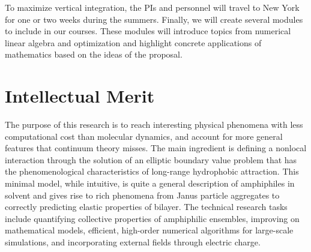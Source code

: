 To maximize vertical integration, the PIs and personnel will travel to
New York for one or two weeks during the summers. Finally, we will
create several modules to include in our courses. These modules will
introduce topics from numerical linear algebra and optimization and
highlight concrete applications of mathematics based on the ideas of the
proposal.

\section{Intellectual Merit}
\label{sec:IntellectualMerit}
The purpose of this research is to reach interesting physical phenomena
with less computational cost than molecular dynamics, and account for
more general features that continuum theory misses. The main ingredient
is defining a nonlocal interaction through the solution of an elliptic
boundary value problem that has the phenomenological characteristics of
long-range hydrophobic attraction. This minimal model, while intuitive,
is quite a general description of amphiphiles in solvent and gives rise
to rich phenomena from Janus particle aggregates to correctly predicting
elastic properties of bilayer. The technical research tasks include
quantifying collective properties of amphiphilic ensembles, improving on
mathematical models, efficient, high-order numerical algorithms for
large-scale simulations, and incorporating external fields through
electric charge.

